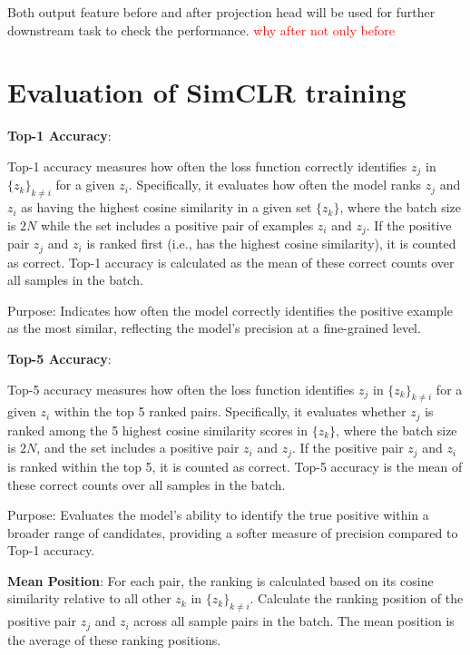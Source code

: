 Both output feature before and after projection head will be used for further downstream task to check the performance.
\textcolor{red}{why after not only before}
\section{Evaluation of SimCLR training} \label{sec:Evaluation result of SImclr}

\textbf{Top-1 Accuracy}:

Top-1 accuracy measures how often the loss function correctly identifies \( z_j \) in \( \{ z_k \}_{k \neq i} \) for a given \( z_i \). Specifically, it evaluates how often the model
 ranks \( z_j \) and \( z_i \) as having the highest cosine similarity in a given set \( \{ z_k \} \), where the batch size is \( 2N \) while the set includes a positive pair of 
 examples \( z_i \) and \( z_j \).  
If the positive pair \( z_j \) and \( z_i \) is ranked first (i.e., has the highest cosine similarity), it is counted as correct. Top-1 accuracy is calculated as the mean of these correct
 counts over all samples in the batch.  

Purpose: Indicates how often the model correctly identifies the positive example as the most similar, reflecting the model's precision at a fine-grained level.


\textbf{Top-5 Accuracy}:

Top-5 accuracy measures how often the loss function identifies \( z_j \) in \( \{ z_k \}_{k \neq i} \) for a given \( z_i \) within the top 5 ranked pairs. Specifically, it evaluates whether \( z_j \) is ranked among the 5 highest cosine similarity scores in \( \{ z_k \} \), where the batch size is \( 2N \), and the set includes a positive pair \( z_i \) and \( z_j \).  
If the positive pair \( z_j \) and \( z_i \) is ranked within the top 5, it is counted as correct. Top-5 accuracy is the mean of these correct counts over all samples in the batch.  

Purpose: Evaluates the model's ability to identify the true positive within a broader range of candidates, providing a softer measure of precision compared to Top-1 accuracy.

\textbf{Mean Position}: 
For each pair, the ranking is calculated based on its cosine similarity relative to all other \( z_k \) in \( \{ z_k \}_{k \neq i} \). Calculate the ranking position of the positive 
pair \( z_j \) and  \( z_i \) across all sample pairs in the batch. The mean position is the average of these ranking positions.

